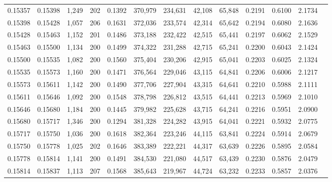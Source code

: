 \begin{tabular}{rrrrrrrrrrrrr}
0.15357 & 0.15398 & 1,249 & 202 &                                     0.1392 & 370,979 & 234,631 &  42,108 &  65,848 & 0.2191 & 0.6100 & 2.1734 \\
0.15398 & 0.15428 & 1,057 & 206 &                                     0.1631 & 372,036 & 233,574 &  42,314 &  65,642 & 0.2194 & 0.6080 & 2.1636 \\
0.15428 & 0.15463 & 1,152 & 201 &                                     0.1486 & 373,188 & 232,422 &  42,515 &  65,441 & 0.2197 & 0.6062 & 2.1529 \\
0.15463 & 0.15500 & 1,134 & 200 &                                     0.1499 & 374,322 & 231,288 &  42,715 &  65,241 & 0.2200 & 0.6043 & 2.1424 \\
0.15500 & 0.15535 & 1,082 & 200 &                                     0.1560 & 375,404 & 230,206 &  42,915 &  65,041 & 0.2203 & 0.6025 & 2.1324 \\
0.15535 & 0.15573 & 1,160 & 200 &                                     0.1471 & 376,564 & 229,046 &  43,115 &  64,841 & 0.2206 & 0.6006 & 2.1217 \\
0.15573 & 0.15611 & 1,142 & 200 &                                     0.1490 & 377,706 & 227,904 &  43,315 &  64,641 & 0.2210 & 0.5988 & 2.1111 \\
0.15611 & 0.15646 & 1,092 & 200 &                                     0.1548 & 378,798 & 226,812 &  43,515 &  64,441 & 0.2213 & 0.5969 & 2.1010 \\
0.15646 & 0.15680 & 1,184 & 200 &                                     0.1445 & 379,982 & 225,628 &  43,715 &  64,241 & 0.2216 & 0.5951 & 2.0900 \\
0.15680 & 0.15717 & 1,346 & 200 &                                     0.1294 & 381,328 & 224,282 &  43,915 &  64,041 & 0.2221 & 0.5932 & 2.0775 \\
0.15717 & 0.15750 & 1,036 & 200 &                                     0.1618 & 382,364 & 223,246 &  44,115 &  63,841 & 0.2224 & 0.5914 & 2.0679 \\
0.15750 & 0.15778 & 1,025 & 202 &                                     0.1646 & 383,389 & 222,221 &  44,317 &  63,639 & 0.2226 & 0.5895 & 2.0584 \\
0.15778 & 0.15814 & 1,141 & 200 &                                     0.1491 & 384,530 & 221,080 &  44,517 &  63,439 & 0.2230 & 0.5876 & 2.0479 \\
0.15814 & 0.15837 & 1,113 & 207 &                                     0.1568 & 385,643 & 219,967 &  44,724 &  63,232 & 0.2233 & 0.5857 & 2.0376 \\

\end{tabular}
